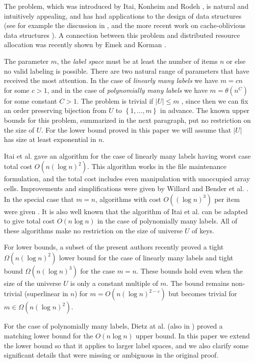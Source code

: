 \documentclass[11pt]{article}
\newcommand{\natInt}[2]{ \left\{ #1, \dotsc, #2 \right\} }
\begin{document}
The problem, which was introduced by Itai, Konheim and Rodeh \cite{Itaietal},
is natural and intuitively appealing, and has had applications to the design of data structures (see for example
the discussion in \cite{DSZ04}, and the more recent work on cache-oblivious data structures
\cite{BenderetalB-Tree,Brodaletal,BDIW}).  A connection between this problem and distributed resource allocation
was recently shown by Emek and Korman \cite{EK11}.


The parameter $m$, the {\em label space} must be at least the number of items $n$ or else no valid labeling is possible.
There are two natural range of parameters that have received the most attention. In the case of {\em linearly many labels} we have
$m=cn$ for some $c>1$, and in the case of {\em polynomially many labels} we have $m=\theta(n^{C})$ for some constant $C>1$.
The problem is trivial if  $|U| \leq m$ , since then we can fix an order preserving
bijection from $U$ to $\natInt{1}{m}$ in advance.   The known upper bounds for this problem, summarized in the next paragraph, put no restriction on the size of $U$.  For the lower bound proved in this paper we will assume that  $|U|$
has size at least exponential in $n$.

Itai et al. \cite{Itaietal} gave an algorithm for the case of linearly many labels having worst case total cost
$O(n (\log n)^2)$.  This algorithm works in the file maintenance formulation, and the total cost includes even manipulation
with unoccupied array cells.
Improvements and simplifications were given by Willard \cite{Willard} and Bender et al. \cite{Benderetal}.
In the special case that $m=n$, algorithms with cost $O((\log n)^3)$ per item were given
\cite{Zhang,BirdSadnicki}.  It is also
well known that the  algorithm of Itai et al. can be adapted to give total cost $O(n \log n)$ in the case
of polynomially many labels.
All of these algorithms make no restriction on the size of
universe $U$ of keys.

For lower bounds, a subset of the present authors
recently proved \cite{BKS} a tight $\Omega(n (\log n)^2)$ lower bound for the case of linearly many labels and tight bound $\Omega(n (\log n)^3)$ for
the case $m=n$. These bounds hold even when the size of the universe $U$ is only a constant multiple of $m$.  The bound remains
non-trivial (superlinear in $n$) for
$m  = O(n (\log n)^{2-\varepsilon})$ but
becomes trivial  for $m \in \Omega(n (\log n)^2)$.


For the case of polynomially many labels, Dietz at al. \cite{DSZ04} (also in \cite{Zhang}) proved a matching lower bound for the $O(n \log n)$ upper bound.
In this paper we extend the lower bound so that it applies to larger label spaces,
and we also clarify some significant details that were missing or ambiguous in the original proof.
\end{document}
